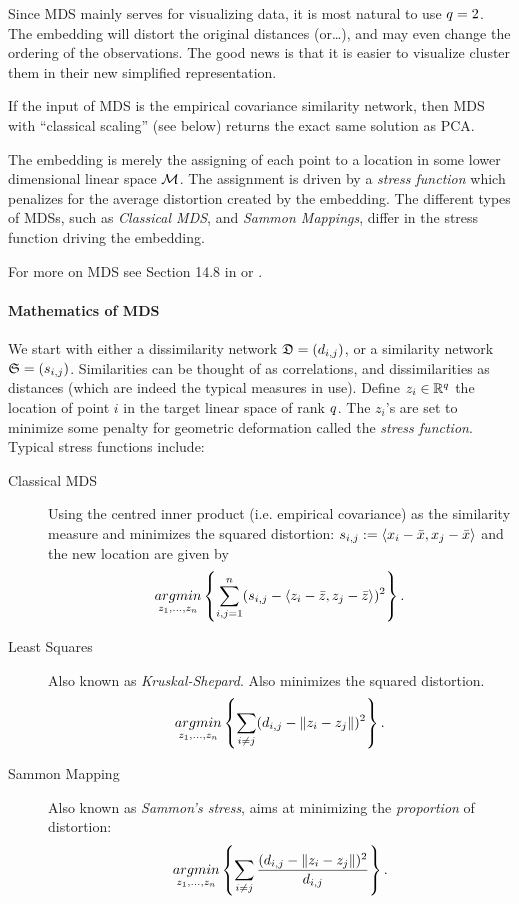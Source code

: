 Since MDS mainly serves for visualizing data, it is most natural to use $q=2$. 
The embedding will distort the original distances (or\dots), and may even change the ordering of the observations. The good news is that it is easier to visualize \andor cluster them in their new simplified representation. 

If the input of MDS is the empirical covariance similarity network, then MDS with ``classical scaling'' (see below) returns the exact same solution as PCA.

The embedding is merely the assigning of each point to a location in some lower dimensional linear space $\mathcal{M}$. 
The assignment is driven by a \emph{stress function} which penalizes for the average distortion created by the embedding.
The different types of MDSs, such as \emph{Classical MDS}, and \emph{Sammon Mappings}, differ in the stress function driving the embedding.

For more on MDS see Section 14.8 in \cite{hastie_elements_2003} or \cite{borg_modern_2005}.


\paragraph{Mathematics of MDS}
We start with either a dissimilarity network $\mathfrak{D}=(d_{i,j})$, or a similarity network $\mathfrak{S}=(s_{i,j})$.
Similarities can be thought of as correlations, and dissimilarities as distances (which are indeed the typical measures in use).
Define $z_i \in \mathbb{R}^q$ the location of point $i$ in the target linear space of rank $q$. 
The $z_i$'s are set to minimize some penalty for geometric deformation called the \emph{stress function}.
Typical stress functions include:
\begin{description}

\item[Classical MDS] Using the centred inner product (i.e. empirical covariance) as the similarity measure and minimizes the squared distortion:
$s_{i,j}:= \left< x_i-\bar x,x_j-\bar{x} \right>$ and the new location are given by
\begin{align}
\label{eq:mds_classical}
	 \mathop{argmin} _{z_1,\dots,z_n}\left\{ \sum_{i,j=1}^{n} (s_{i,j}-\left< z_i-\bar z,z_j-\bar{z} \right> )^2 \right\}.
\end{align}

\item[Least Squares] Also known as \emph{Kruskal-Shepard}. Also minimizes the squared distortion. 
\begin{align}
\label{eq:mds_stress}
	 \mathop{argmin} _{z_1,\dots,z_n}\left\{ \sum_{i \neq j} (d_{i,j}-\Vert z_i-z_j \Vert )^2 \right\}.
\end{align}

\item[Sammon Mapping] Also known as \emph{Sammon's stress}, aims at minimizing the \emph{proportion} of distortion:
\begin{align}
\label{eq:mds_sammon}
	 \mathop{argmin} _{z_1,\dots,z_n}\left\{ \sum_{i \neq j} \frac{(d_{i,j}-\Vert z_i-z_j \Vert )^2}{d_{i,j}} \right\}.
\end{align}

\end{description}


